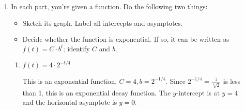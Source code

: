 \documentclass{article}
\begin{document}
\begin{enumerate}
\begin{enumerate}
\begin{enumerate}
      \begin{solution}
        A population of $250,000$ would correspond to linear growth from 2010 to 2020.
        After 2010, the exponential function overtakes the linear function,
        so under an assumption of exponential growth, the population in 2020 would have been
        greater than 250,000.
        \begin{center}
        \end{center}
      \end{solution}
    \end{enumerate}

  \end{enumerate}

\item 


  In each part, you're given a function. Do the following two things:
  \begin{itemize}
  \item Sketch its graph. Label all intercepts and asymptotes. 
  \item Decide whether the function is exponential. If so, it can be written as $f(t) = C \cdot b^t$; identify $C$ and $b$. 
  \end{itemize}

  \begin{enumerate}
  \item
    \begin{problem}[\vfill]
      $f(t) = 4 \cdot 2^{-t/4}$
    \end{problem}

    \begin{solution}
      This is an exponential function, $C=4, b=2^{-1/4}$. Since 
      $2^{-1/4} = \frac{1}{\sqrt[4]{2}}$ is less than 1, this is an exponential decay
      function. The $y$-intercept is at $y=4$ and the horizontal asymptote is $y=0$.
      

\end{solution}
\end{enumerate}
\end{enumerate}
\end{document}

